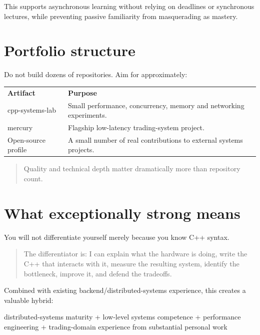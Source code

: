 \documentclass[11pt,letterpaper]{article}
\begin{document}
This supports asynchronous learning without relying on deadlines or synchronous lectures, while preventing passive familiarity from masquerading as mastery.

\section{Portfolio structure}\label{sec:20}

Do not build dozens of repositories. Aim for approximately:

\begin{center}
\small
\begin{tabular}{>{\raggedright\arraybackslash}p{}>{\raggedright\arraybackslash}p{}}
\textbf{Artifact} & \textbf{Purpose} \\
cpp-systems-lab & Small performance, concurrency, memory and networking experiments. \\
mercury & Flagship low-latency trading-system project. \\
Open-source profile & A small number of real contributions to external systems projects. \\
\end{tabular}
\end{center}

\begin{quote}
Quality and technical depth matter dramatically more than repository count.
\end{quote}

\section{What exceptionally strong means}\label{sec:21}

You will not differentiate yourself merely because you know C++ syntax.

\begin{quote}
The differentiator is: I can explain what the hardware is doing, write the C++ that interacts with it, measure the resulting system, identify the bottleneck, improve it, and defend the tradeoffs.
\end{quote}

Combined with existing backend/distributed-systems experience, this creates a valuable hybrid:

{\ttfamily\raggedright distributed-systems maturity  +  low-level systems competence  +  performance engineering +  trading-domain experience from substantial personal work\par}
\end{document}
